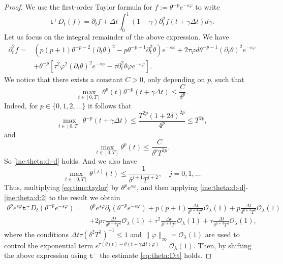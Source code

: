 \documentclass[11pt,oneside,leqno]{amsart}
\numberwithin{equation}{section}
\numberwithin{equation}{section}
\newcommand{\trp}{\mathtt t^+}
\newcommand{\trm}{\mathtt t^-}
\begin{document}
\begin{proof}
We use the first-order Taylor formula for  $f:=\theta^{-p}e^{-s\varphi}$ to write
\begin{equation}\label{eq:time:taylor}
    \trp D_{t}(f)=\partial_{t}f+\Delta t\int_{0}^{1}(1-\gamma)\partial_{t}^{2}f(t+\gamma \Delta t)d\gamma.
\end{equation}
Let us focus on the integral remainder of the above expression. We have
\begin{equation*}
\begin{aligned}
    \partial_{t}^{2}f=&(p(p+1)\theta^{-p-2}(\partial_{t}\theta)^{2}-p\theta^{-p-1}\partial_{t}^{2}\theta)e^{-s\varphi}+2\tau\varphi d\theta^{-p-1}(\partial_{t}\theta)^{2}e^{-s\varphi}\\
    &+\theta^{-p}\left[ \tau^{2}\varphi^{2}(\partial_{t}\theta)^{2}e^{-s\varphi}-\tau\partial_{t}^{2}\theta\varphi e^{-s\varphi}\right].
      \end{aligned}
\end{equation*}
We notice that there exists a constant $C>0$, only depending on $p$, such that
\begin{equation}\label{ine:theta:d:-d}
    \max_{t\in [0,T]} \theta^{p}(t)\theta^{-p}(t+\gamma\Delta t)\leq \frac{C}{\delta^{p}}.
\end{equation} Indeed, for $p\in\{0,1,2,\ldots\}$ it follows that
\begin{equation}\label{ine:max:theta}
    \max_{t\in[0,T]}\theta^{-p}(t+\gamma\Delta t)\leq   \frac{T^{2p}(1+2\delta)^{2p}}{4^{p}}\leq T^{2p},
    \end{equation}
    and 
    \begin{equation}\label{ine:theta:d}
    \max_{t\in[0,T]} \theta^{p}(t)\leq \frac{C}{\delta^{p}T^{2p}}.
\end{equation} 
So \eqref{ine:theta:d:-d} holds. And we also have
\begin{equation}\label{ine:theta:d:2}
    \max_{t\in[0,T]}\theta^{(j)}(t)\leq \frac{1}{\delta^{j+1}T^{j+2}},\quad j=0,1,\ldots
\end{equation}
Thus, multiplying \eqref{eq:time:taylor} by $\theta^{p}e^{s\varphi}$, and then applying \eqref{ine:theta:d:-d}-\eqref{ine:theta:d:2} to the result we obtain
\begin{equation}
\begin{aligned}
    \theta^{p}e^{s\varphi}\trp D_{t}(\theta^{-p}e^{-s\varphi})=&\theta^{p}e^{s\varphi}\partial_{t}(\theta^{-p}e^{-s\varphi})+p(p+1)\frac{\Delta t}{\delta^{p+4}T^{2}}\mathcal{O}_{\lambda}(1)+p\frac{\Delta t}{\delta^{p+3}T^{2}}\mathcal{O}_{\lambda}(1)\\
    &+2p\tau\frac{\Delta t}{\delta^{p+4}T^{4}}\mathcal{O}_{\lambda}(1)+\tau^{2} \frac{\Delta t}{\delta^{p+4}T^{6}}\mathcal{O}_{\lambda}(1)+\tau\frac{\Delta t}{\delta^{p+3}T^{4}}\mathcal{O}_{\lambda}(1),
\end{aligned}
\end{equation}
where the conditions $\Delta t\tau(\delta^{2} T^{3})^{-1}\leq 1$ and $\|\varphi\|_{\infty}=\mathcal{O}_{\lambda}(1)$ are used to control the exponential term $e^{\tau(\theta(t)-\theta(t+\gamma\Delta t)\varphi)}=\mathcal{O}_{\lambda}(1)$. Then, by shifting the above expression using $\trm$ the estimate \eqref{eq:theta:D:t} holds.
\end{proof}
\end{document}
